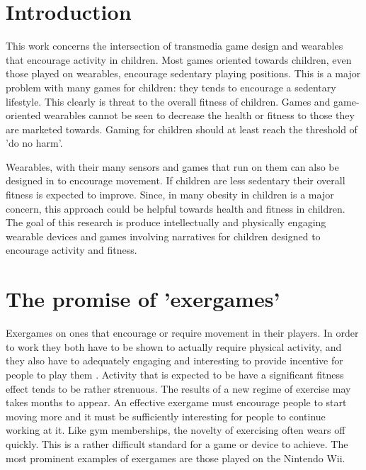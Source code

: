 \documentclass{SIGCHI2015LaTex/sigchi}
\begin{document}


\section{Introduction}
This work concerns the intersection of transmedia game design and wearables that encourage activity in children. Most games oriented towards children, even those played on wearables, encourage sedentary playing positions. This is a major problem with many games for children: they tends to encourage a sedentary lifestyle. This clearly is threat to the overall fitness of children. Games and game-oriented wearables cannot be seen to decrease the health or fitness to those they are marketed towards. Gaming for children should at least reach the threshold of 'do no harm'. 

Wearables, with their many sensors and games that run on them can also be designed in to encourage movement. If children are less sedentary their overall fitness is expected to improve. Since, in many obesity in children is a major concern, this approach could be helpful towards health and fitness in children. The goal of this research is produce intellectually and physically engaging wearable devices and games involving narratives for children designed to encourage activity and fitness. 

\section{The promise of 'exergames'}
Exergames on ones that encourage or require movement in their players. In order to work they both have to be shown to actually require physical activity, and they also have to adequately engaging and interesting to provide incentive for people to play them \cite{whitehead2010exergame}. Activity that is expected to be have a significant fitness effect tends to be rather strenuous. The results of a new regime of exercise may takes months to appear. An effective exergame must encourage people to start moving more and it must be sufficiently interesting for people to continue working at it. Like gym memberships, the novelty of exercising often wears off quickly. This is a rather difficult standard for a game or device to achieve. The most prominent examples of exergames are those played on the Nintendo Wii. 
\end{document}
